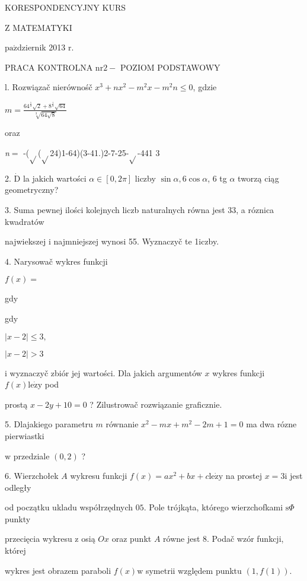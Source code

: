 \documentclass[a4paper,12pt]{article}
\begin{document}
KORESPONDENCYJNY KURS

Z MATEMATYKI

$\mathrm{p}\mathrm{a}\acute{\mathrm{z}}$dziernik 2013 $\mathrm{r}.$

PRACA KONTROLNA $\mathrm{n}\mathrm{r} 2-$ POZIOM PODSTAWOWY

l. Rozwiązač nierównośč $x^{3}+nx^{2}-m^{2}x-m^{2}n\leq 0$, gdzie

$m=\displaystyle \frac{64^{\frac{1}{3}}\sqrt{2}+8^{\frac{1}{3}}\sqrt{64}}{\sqrt[3]{64\sqrt{8}}}$

oraz

{\it n}$=$ -($\sqrt{}$($\sqrt{}$24)1-64)(3-41.)2-7-25-$\sqrt{}$-441 3

2. $\dot{\mathrm{D}}$ la jakich wartości $\alpha\in[0,2\pi]$ liczby $\sin\alpha,  6\cos\alpha$, 6 tg $\alpha$ tworzą ciąg geometryczny?

3. Suma pewnej ilości kolejnych liczb naturalnych równa jest 33, a róznica kwadratów

najwiekszej $\mathrm{i}$ najmniejszej wynosi 55. Wyznaczyč te 1iczby.

4. Narysowač wykres funkcji

$f(x)=$

gdy

gdy

$|x-2|\leq 3,$

$|x-2|>3$

$\mathrm{i}$ wyznaczyč zbiór jej wartości. Dla jakich argumentów $x$ wykres funkcji $f(x) \mathrm{l}\mathrm{e}\dot{\mathrm{z}}\mathrm{y}$ pod

prostą $x-2y+10=0$ ? Zilustrowač rozwiązanie graficznie.

5. Dlajakiego parametru $m$ równanie $x^{2}-mx+m^{2}-2m+1=0$ ma dwa rózne pierwiastki

$\mathrm{w}$ przedziale $(0,2)$ ?

6. Wierzchołek $A$ wykresu funkcji $f(x)=ax^{2}+bx+c\mathrm{l}\mathrm{e}\dot{\mathrm{z}}\mathrm{y}$ na prostej $x=3\mathrm{i}$ jest odległy

od początku ukladu współrzędnych $05$. Pole trójkąta, którego wierzchofkami $\mathrm{s}\Phi$ punkty

przecięcia wykresu $\mathrm{z}$ osią $Ox$ oraz punkt $A$ równe jest 8. Podač wzór funkcji, której

wykres jest obrazem paraboli $f(x)\mathrm{w}$ symetrii względem punktu $(1,f(1)).$
\end{document}
